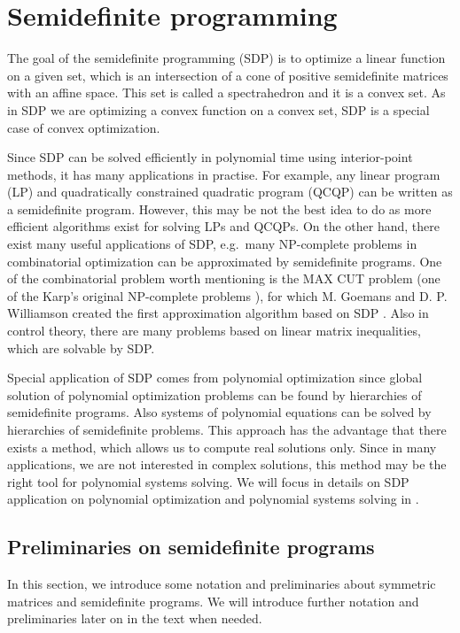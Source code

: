 \chapter{Semidefinite programming}
The goal of the semidefinite programming (SDP) is to optimize a linear function on a given set, which is an intersection of a cone of positive semidefinite matrices with an affine space.
This set is called a spectrahedron and it is a convex set.
As in SDP we are optimizing a convex function on a convex set, SDP is a special case of convex optimization.

Since SDP can be solved efficiently in polynomial time using interior-point methods, it has many applications in practise.
For example, any linear program (LP) and quadratically constrained quadratic program (QCQP) can be written as a semidefinite program.
However, this may be not the best idea to do as more efficient algorithms exist for solving LPs and QCQPs.
On the other hand, there exist many useful applications of SDP, e.g.\ many NP-complete problems in combinatorial optimization can be approximated by semidefinite programs. 
One of the combinatorial problem worth mentioning is the MAX CUT problem (one of the Karp's original NP-complete problems \cite{karp1972}), for which M. Goemans and D. P. Williamson created the first approximation algorithm based on SDP \cite{max-cut}.
Also in control theory, there are many problems based on linear matrix inequalities, which are solvable by SDP.\@

Special application of SDP comes from polynomial optimization since global solution of polynomial optimization problems can be found by hierarchies of semidefinite programs.
Also systems of polynomial equations can be solved by hierarchies of semidefinite problems.
This approach has the advantage that there exists a method, which allows us to compute real solutions only.
Since in many applications, we are not interested in complex solutions, this method may be the right tool for polynomial systems solving.
We will focus in details on SDP application on polynomial optimization and polynomial systems solving in .

\section{Preliminaries on semidefinite programs}
In this section, we introduce some notation and preliminaries about symmetric matrices and semidefinite programs.
We will introduce further notation and preliminaries later on in the text when needed.

